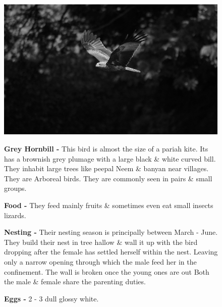 \begin{figure}[H]
\begin{center}
\includegraphics{figure/Land_birds/01_pariah_kite/pariah-kite.eps}
\end{center}
\medskip
\noindent
{\bf Grey Hornbill -} This bird is almost the size of a pariah kite. Its has a brownish grey plumage with a large black \& white curved bill. They inhabit large trees like peepal Neem \& banyan near villages. They are Arboreal birds. They are commonly seen in pairs \& small groups.

\medskip
{\bf Food -} They feed mainly fruits \& sometimes even eat small insects lizards.

{\bf Nesting -} Their nesting season is principally between March - June. They build their nest in tree hallow \& wall it up with the bird dropping after the female has settled herself within the nest. Leaving only a narrow opening through which the male feed her in the confinement. The wall is broken once the young ones are out Both the male \& female share the parenting duties.

{\bf Eggs -} 2 - 3 dull glossy white.
\end{figure}

\vfill\eject

~\phantom{a}
\vfill

